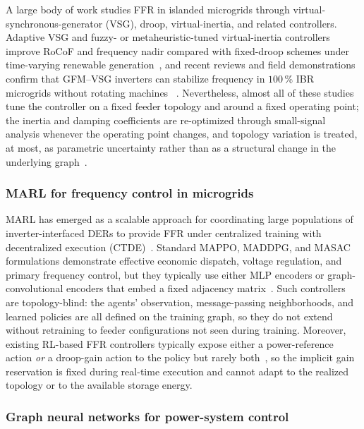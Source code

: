 \documentclass[lettersize,journal]{IEEEtran}
\begin{document}
A large body of work studies FFR in islanded microgrids through virtual-synchronous-generator (VSG), droop, virtual-inertia, and related controllers. Adaptive VSG and fuzzy- or metaheuristic-tuned virtual-inertia controllers improve RoCoF and frequency nadir compared with fixed-droop schemes under time-varying renewable generation~\cite{boutfarjoute2025fuzzy, hamanah2024robust,mishra2024metaheuristic}, and recent reviews and field demonstrations confirm that GFM--VSG inverters can stabilize frequency in $100$\,\% IBR microgrids without rotating machines ~\cite{perez2023adaptive,bakeer2024bidirectional,salem2025gfmreview,sati2025economic}. Nevertheless, almost all of these studies tune the controller on a fixed feeder topology and around a fixed operating point; the inertia and damping coefficients are re-optimized through small-signal analysis whenever the operating point changes, and topology variation is treated, at most, as parametric uncertainty rather than as a structural change in the underlying graph~\cite{mishra2024metaheuristic,hamanah2024robust}.

\subsubsection{MARL for frequency control in microgrids}

MARL has emerged as a scalable approach for coordinating large populations of inverter-interfaced DERs to provide FFR under centralized training with decentralized execution (CTDE)~\cite{dolatyabi2025happo,shi2025coordvpp}. Standard MAPPO, MADDPG, and MASAC formulations demonstrate effective economic dispatch, voltage regulation, and primary frequency control, but they typically use either MLP encoders or graph-convolutional encoders that embed a fixed adjacency matrix~\cite{wang2025mappo,qiu2023hierarchical,wang2023graphppo,guo2024gcnnppo,guo2024ldlfc}. Such controllers are topology-blind: the agents' observation, message-passing neighborhoods, and learned policies are all defined on the training graph, so they do not extend without retraining to feeder configurations not seen during training. Moreover, existing RL-based FFR controllers typically expose either a power-reference action \emph{or} a droop-gain action to the policy but rarely both~\cite{hu2022multitimescale,wang2025mappo}, so the implicit gain reservation is fixed during real-time execution and cannot adapt to the realized topology or to the available storage energy.

\subsubsection{Graph neural networks for power-system control}
\end{document}
